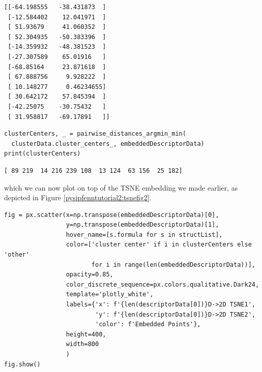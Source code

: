 \begin{verbatim}
[[-64.198555   -38.431873  ]
 [-12.584402    12.041971  ]
 [ 51.93679     41.060352  ]
 [ 52.304935   -50.383396  ]
 [-14.359932   -48.381523  ]
 [-27.307589    65.01916   ]
 [-68.85164     23.871618  ]
 [ 67.888756     9.928222  ]
 [ 10.148277     0.46234655]
 [ 30.642172    57.845394  ]
 [-42.25075    -30.75432   ]
 [ 31.958817   -69.17891   ]]
\end{verbatim}

\begin{verbatim}
clusterCenters, _ = pairwise_distances_argmin_min(
  clusterData.cluster_centers_, embeddedDescriptorData)
print(clusterCenters)
\end{verbatim}

\begin{verbatim}
[ 89 219  14 216 239 108  13 124  63 156  25 182]
\end{verbatim}

which we can now plot on top of the TSNE embedding we made earlier, as depicted in Figure \ref{pysipfenntutorial2:tsnefig2}.

\begin{verbatim}
fig = px.scatter(x=np.transpose(embeddedDescriptorData)[0],
                 y=np.transpose(embeddedDescriptorData)[1],
                 hover_name=[s.formula for s in structList],
                 color=['cluster center' if i in clusterCenters else 'other' 
                        for i in range(len(embeddedDescriptorData))],
                 opacity=0.85,
                 color_discrete_sequence=px.colors.qualitative.Dark24,
                 template='plotly_white',
                 labels={'x': f'{len(descriptorData[0])}D->2D TSNE1',
                         'y': f'{len(descriptorData[0])}D->2D TSNE2',
                         'color': f'Embedded Points'},
                 height=400,
                 width=800
                 )
fig.show()
\end{verbatim}

